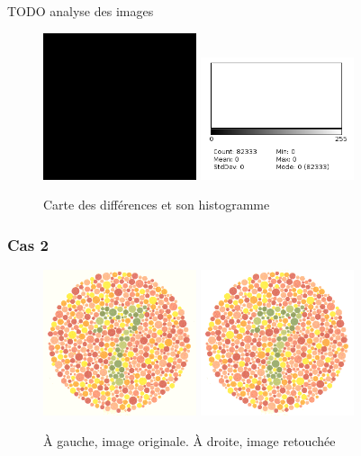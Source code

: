 \documentclass[a4paper]{article}
\begin{document}
TODO analyse des images

\begin{figure}[H]
\begin{center}
\includegraphics[width=170px]{../resultats/e1_q2_k1_diff.png}
\includegraphics[width=170px]{../resultats/e1_q2_k1_diff_hist.png}
\end{center}
\caption{Carte des différences et son histogramme}
\end{figure}

\clearpage
\subsubsection{Cas 2}

\begin{figure}[H]
\begin{center}
\includegraphics[width=170px]{../base/cas_2_dalton7.png}
\includegraphics[width=170px]{../resultats/e1_q2_k2_luminance.png}
\end{center}
\caption{À gauche, image originale. À droite, image retouchée}
\end{figure}
\end{document}
